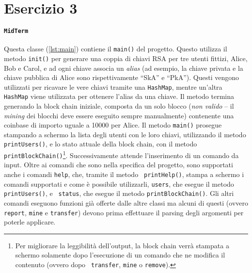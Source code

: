 \section{Esercizio 3}

\paragraph{\texttt{\textbf{MidTerm}}} Questa classe (\autoref{lst:main})
contiene il {\tt main()} del progetto. Questo utilizza il metodo {\tt init()}
per generare una coppia di chiavi RSA per tre utenti fittizi, Alice, Bob e
Carol, e ad ogni chiave associa un \emph{alias} (ad esempio, la chiave privata e
la chiave pubblica di Alice sono rispettivamente ``SkA'' e ``PkA''). Questi
vengono utilizzati per ricavare le vere chiavi tramite una {\tt HashMap}, mentre
un'altra {\tt HashMap} viene utilizzata per ottenere l'alias da una chiave. Il
metodo termina generando la block chain iniziale, composta da un solo blocco
(\emph{non valido} -- il \emph{mining} dei blocchi deve essere eseguito sempre
manualmente) contenente una coinbase di importo uguale a 10000 per Alice. Il
metodo {\tt main()} prosegue stampando a schermo la lista degli utenti con le
loro chiavi, utilizzando il metodo {\tt printUsers()}, e lo stato attuale della
block chain, con il metodo {\tt printBlockChain()}\footnote{Per migliorare la
leggibilità dell'output, la block chain verrà stampata a schermo solamente dopo
l'esecuzione di un comando che ne modifica il contenuto (ovvero dopo {\tt
transfer}, {\tt mine} o {\tt remove}).}. Successivamente attende l'inserimento
di un comando da input. Oltre ai comandi che sono nella specifica del progetto,
sono supportati anche i comandi {\tt help}, che, tramite il metodo {\tt
printHelp()}, stampa a schermo i comandi supportati e come è possibile
utilizzarli, {\tt users}, che esegue il metodo {\tt printUsers()}, e {\tt
status}, che esegue il metodo {\tt printBlockChain()}. Gli altri comandi
eseguono funzioni già offerte dalle altre classi ma alcuni di questi (ovvero
{\tt report}, {\tt mine} e {\tt transfer}) devono prima effettuare il parsing
degli argomenti per poterle applicare.


